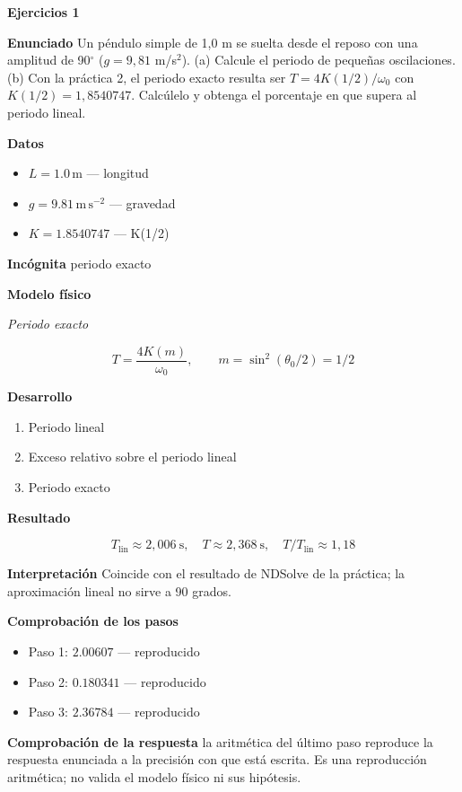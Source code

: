 \documentclass[10pt,openany]{book}
\begin{document}
\noindent\textbf{Ejercicios 1}

\noindent\textbf{Enunciado}
Un péndulo simple de 1,0 m se suelta desde el reposo con una amplitud de 90\(^\circ\) (\(g = 9{,}81\) m/s\(^2\)). (a) Calcule el periodo de pequeñas oscilaciones. (b) Con la práctica 2, el periodo exacto resulta ser \(T = 4K(1/2)/\omega_0\) con \(K(1/2) = 1{,}8540747\). Calcúlelo y obtenga el porcentaje en que supera al periodo lineal.

\noindent\textbf{Datos}
\begin{itemize}
\item $L = 1.0\,\mathrm{m}$ — longitud
\item $g = 9.81\,\mathrm{m}\,\mathrm{s}^{-2}$ — gravedad
\item $K = 1.8540747$ — K(1/2)
\end{itemize}

\noindent\textbf{Incógnita}
periodo exacto

\noindent\textbf{Modelo físico}

\noindent\textit{Periodo exacto}

\[
T = \frac{4K(m)}{\omega_0},\qquad m = \sin^{2}(\theta_0/2) = 1/2
\]

\noindent\textbf{Desarrollo}
\begin{enumerate}
\item
Periodo lineal
\item
Exceso relativo sobre el periodo lineal
\item
Periodo exacto
\end{enumerate}

\noindent\textbf{Resultado}

\[
T_{\mathrm{lin}} \approx 2{,}006\ \mathrm{s},\quad T \approx 2{,}368\ \mathrm{s},\quad T/T_{\mathrm{lin}} \approx 1{,}18
\]

\noindent\textbf{Interpretación}
Coincide con el resultado de NDSolve de la práctica; la aproximación lineal no sirve a 90 grados.

\noindent\textbf{Comprobación de los pasos}
\begin{itemize}
\item Paso 1: $2.00607$ — reproducido
\item Paso 2: $0.180341$ — reproducido
\item Paso 3: $2.36784$ — reproducido
\end{itemize}

\noindent\textbf{Comprobación de la respuesta} la aritmética del último paso reproduce la respuesta enunciada a la precisión con que está escrita. Es una reproducción aritmética; no valida el modelo físico ni sus hipótesis.
\end{document}
